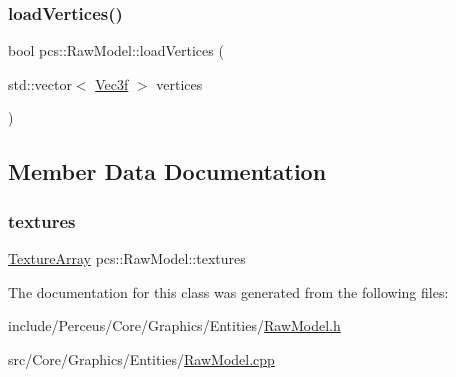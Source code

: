 \mbox{\label{classpcs_1_1RawModel_ac87cd0d4a1bd6d587b9e680f02a810c3}} 
\subsubsection{\texorpdfstring{load\+Vertices()}{loadVertices()}}
{\footnotesize\ttfamily bool pcs\+::\+Raw\+Model\+::load\+Vertices (\begin{DoxyParamCaption}\item[{std\+::vector$<$ \hyperlink{namespacepcs_a68e0f517680976c17c810ffe6952cbab}{Vec3f} $>$}]{vertices }\end{DoxyParamCaption})}



\subsection{Member Data Documentation}
\mbox{\label{classpcs_1_1RawModel_a5441811d19297669eefdb405ea94ce0c}} 
\subsubsection{\texorpdfstring{textures}{textures}}
{\footnotesize\ttfamily \hyperlink{unionpcs_1_1TextureArray}{Texture\+Array} pcs\+::\+Raw\+Model\+::textures\hspace{0.3cm}{\ttfamily [private]}}



The documentation for this class was generated from the following files\+:\begin{DoxyCompactItemize}
\item 
include/\+Perceus/\+Core/\+Graphics/\+Entities/\hyperlink{RawModel_8h}{Raw\+Model.\+h}\item 
src/\+Core/\+Graphics/\+Entities/\hyperlink{RawModel_8cpp}{Raw\+Model.\+cpp}\end{DoxyCompactItemize}
